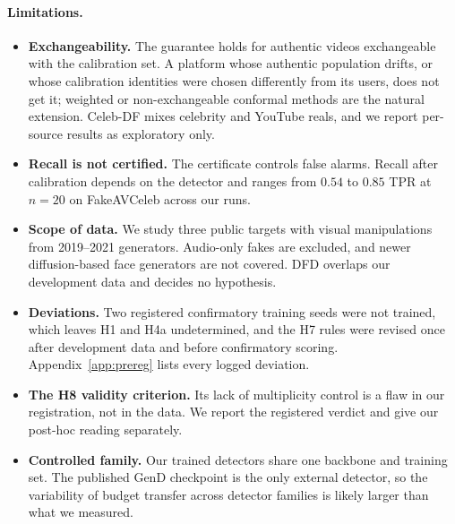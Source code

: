 \paragraph{Limitations.}
\begin{itemize}[leftmargin=*,itemsep=2pt]
    \item \textbf{Exchangeability.} The guarantee holds for authentic videos exchangeable with the calibration set. A platform whose authentic population drifts, or whose calibration identities were chosen differently from its users, does not get it; weighted or non-exchangeable conformal methods \citep{tibshirani2019conformal,barber2023beyond} are the natural extension. Celeb-DF mixes celebrity and YouTube reals, and we report per-source results as exploratory only.
    \item \textbf{Recall is not certified.} The certificate controls false alarms. Recall after calibration depends on the detector and ranges from $0.54$ to $0.85$ TPR at $n=20$ on FakeAVCeleb across our runs.
    \item \textbf{Scope of data.} We study three public targets with visual manipulations from 2019--2021 generators. Audio-only fakes are excluded, and newer diffusion-based face generators are not covered. DFD overlaps our development data and decides no hypothesis.
    \item \textbf{Deviations.} Two registered confirmatory training seeds were not trained, which leaves H1 and H4a undetermined, and the H7 rules were revised once after development data and before confirmatory scoring. Appendix~\ref{app:prereg} lists every logged deviation.
    \item \textbf{The H8 validity criterion.} Its lack of multiplicity control is a flaw in our registration, not in the data. We report the registered verdict and give our post-hoc reading separately.
    \item \textbf{Controlled family.} Our trained detectors share one backbone and training set. The published GenD checkpoint is the only external detector, so the variability of budget transfer across detector families is likely larger than what we measured.
\end{itemize}

